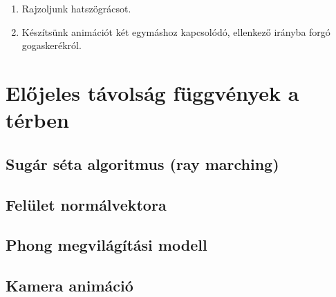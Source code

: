 \progfeladatok
\begin{enumerate}[resume]
  \item Rajzoljunk hatszögrácsot.
  \item Készítsünk animációt két egymáshoz kapcsolódó, ellenkező irányba forgó gogaskerékról.

\end{enumerate}

\section{Előjeles távolság függvények a térben}

\subsection{Sugár séta algoritmus (ray marching)}


\subsection{Felület normálvektora}


\subsection{Phong megvilágítási modell}

\subsection{Kamera animáció}




